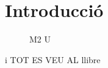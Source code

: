 \section*{Introducció}

\lipsum[9]

\lipsum[9]

\begin{figure}[h!]
\centering\RubikCubeSolvedWY
{}
\caption{M2 U}
\label{solved}
\end{figure}

i TOT ES VEU AL llibre \cite{ross_rubiks}
